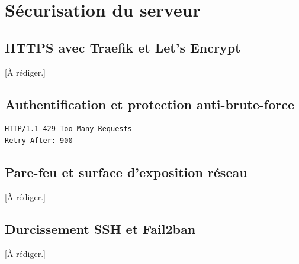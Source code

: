 \chapter{Sécurisation du serveur}
\label{chap:securisation}

\section{HTTPS avec Traefik et Let's Encrypt}
[À rédiger.]

\section{Authentification et protection anti-brute-force}
\begin{lstlisting}[language=bash,caption={Réponse du serveur après verrouillage},label={lst:429}]
HTTP/1.1 429 Too Many Requests
Retry-After: 900
\end{lstlisting}

\section{Pare-feu et surface d'exposition réseau}
[À rédiger.]

\section{Durcissement SSH et Fail2ban}
[À rédiger.]

\clearpage
